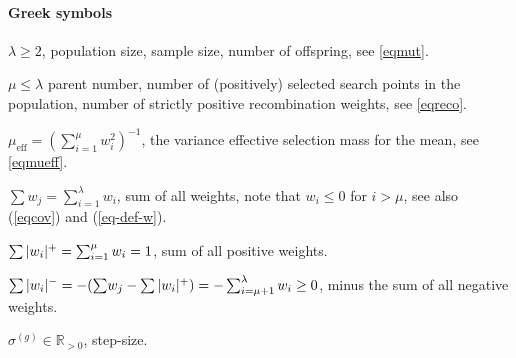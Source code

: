\documentclass{article} %
\newcommand{\R}{\mathbb{R}}
\newcommand{\rklam}[1]{\left({#1}\right)}
\newcommand{\mueff}{\ensuremath{\mu_\mathrm{eff}}}
\newcommand{\sumw}[1][j]{\ensuremath{{\textstyle\sum{\!w_{#1}}}}}
\newcommand{\mucov}{\mu_\mathrm{cov}}
\newcommand{\summ}[2]{\sum_{#1=1}^{#2}}
\newcommand{\lam}{\ensuremath{\lambda}}
\newcommand{\sigg}{\sigma^{(g)}}
\newcommand{\eqrefadd}[1]{(\ref{#1})} %
\newcommand{\eqsref}[1]{(\ref{#1})}
\begin{document}
\paragraph{Greek symbols}
\begin{description}\addtolength{\itemsep}{-0.9ex}
\item $\lam\ge2$, population size, sample size, number of offspring,
    see \eqref{eqmut}. 
\item $\mu\le\lam$ parent number, number of (positively) selected search points
  in the population, number of strictly positive recombination weights, see \eqref{eqreco}. 
\item{$\mueff = \rklam{\summ{i}{\mu}w_i^2}^{-1}$, the variance
  effective selection mass for the mean, see \eqref{eqmueff}. }
\item{$\sumw = \summ{i}{\lam}w_i$, sum of all weights, note that $w_i\le0$ for $i>\mu$, see also \eqsref{eqcov} and \eqrefadd{eq-def-w}. } 
\item{$\possum{w_i} = \summ{i}{\mu}w_i = 1$, sum of all positive weights. } 
\item{$\negsum{w_i} = -(\sumw - \possum{w_i}) = -\sum_{i=\mu+1}^\lam w_i\ge0$, minus the sum of all 
  negative weights. } 
\item{$\sigg\in\R_{>0}$, step-size.}
\end{description}

\end{document}
